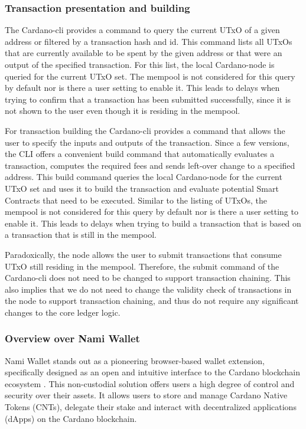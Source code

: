 \documentclass[11pt]{article}
\begin{document}
\subsubsection{Transaction presentation and building}

The Cardano-cli provides a command to query the current UTxO of a given address or filtered by a transaction hash and id.
This command lists all UTxOs that are currently available to be spent by the given address or that were an output of the specified transaction.
For this list, the local Cardano-node is queried for the current UTxO set.
The mempool is not considered for this query by default nor is there a user setting to enable it.
This leads to delays when trying to confirm that a transaction has been submitted successfully, since it is not shown to the user even though it is residing in the mempool.

For transaction building the Cardano-cli provides a command that allows the user to specify the inputs and outputs of the transaction.
Since a few versions, the CLI offers a convenient build command that automatically evaluates a transaction, computes the required fees
and sends left-over change to a specified address.
This build command queries the local Cardano-node for the current UTxO set and uses it to build the transaction and evaluate potential Smart Contracts
that need to be executed.
Similar to the listing of UTxOs, the mempool is not considered for this query by default nor is there a user setting to enable it.
This leads to delays when trying to build a transaction that is based on a transaction that is still in the mempool.

Paradoxically, the node allows the user to submit transactions that consume UTxO still residing in the mempool.
Therefore, the submit command of the Cardano-cli does not need to be changed to support transaction chaining.
This also implies that we do not need to change the validity check of transactions in the node to support transaction chaining, 
and thus do not require any significant changes to the core ledger logic.


\subsubsection{Overview over Nami Wallet}

Nami Wallet stands out as a pioneering browser-based wallet extension, specifically designed as an open and intuitive interface to the Cardano blockchain ecosystem \cite{nami}.
This non-custodial solution offers users a high degree of control and security over their assets.
It allows users to store and manage Cardano Native Tokens (CNTs), delegate their stake and interact with decentralized applications (dApps) on the Cardano blockchain.
\end{document}
